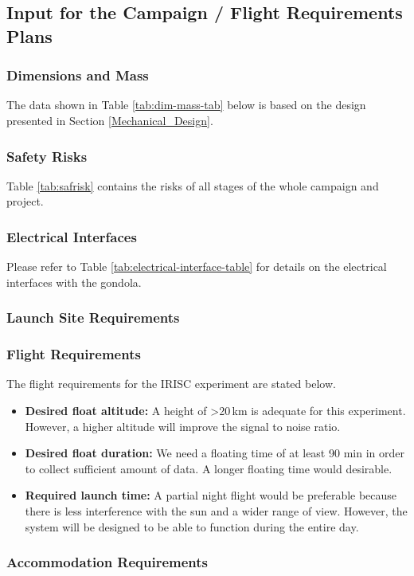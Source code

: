 \subsection{Input for the Campaign / Flight Requirements Plans}


\subsubsection{Dimensions and Mass}
\label{sec:dim-mass}

The data shown in Table \ref{tab:dim-mass-tab} below is based on the design presented in Section \ref{Mechanical_Design}. %



\subsubsection{Safety Risks}
Table \ref{tab:safrisk} contains the risks of all stages of the whole campaign and project.


\subsubsection{Electrical Interfaces}

Please refer to Table \ref{tab:electrical-interface-table} for details on the electrical interfaces with the gondola.



\subsubsection{Launch Site Requirements}


\subsubsection{Flight Requirements}
The flight requirements for the IRISC experiment are stated below.
\begin{itemize}
	\item \textbf{Desired float altitude:} A height of >20\,km is adequate for this experiment. However, a higher altitude will improve the signal to noise ratio.
	\item \textbf{Desired float duration:} We need a floating time of at least 90 min in order to collect sufficient amount of data. A longer floating time would desirable.
	\item \textbf{Required launch time:} A partial night flight would be preferable because there is less interference with the sun and a wider range of view. However, the system will be designed to be able to function during the entire day.
\end{itemize}

\subsubsection{Accommodation Requirements}

